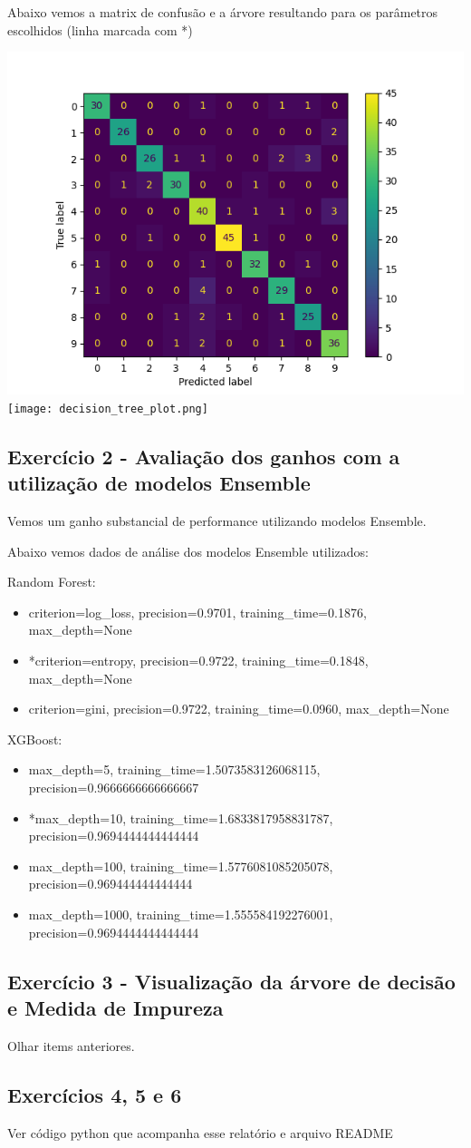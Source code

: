 \documentclass[11pt]{article}
\begin{document}
Abaixo vemos a matrix de confusão e a árvore resultando para os parâmetros escolhidos (linha marcada com *)
\\
\begin{center}
\includegraphics[height=0.28\textheight]{decision_tree_confusion_matrix.png}
\\
\texttt{[image: decision\_tree\_plot.png]}
\end{center}

\subsection{Exercício 2 - Avaliação dos ganhos com a utilização de modelos Ensemble}
Vemos um ganho substancial de performance utilizando modelos Ensemble.

Abaixo vemos dados de análise dos modelos Ensemble utilizados:

Random Forest:
\begin{itemize}
  \item criterion=log\_loss, precision=0.9701, training\_time=0.1876, max\_depth=None
  \item *criterion=entropy, precision=0.9722, training\_time=0.1848, max\_depth=None
  \item criterion=gini, precision=0.9722, training\_time=0.0960, max\_depth=None
\end{itemize}

XGBoost:
\begin{itemize}
  \item max\_depth=5, training\_time=1.5073583126068115, precision=0.9666666666666667 
  \item *max\_depth=10, training\_time=1.6833817958831787, precision=0.9694444444444444
  \item max\_depth=100, training\_time=1.5776081085205078, precision=0.969444444444444 
  \item max\_depth=1000, training\_time=1.555584192276001, precision=0.9694444444444444
\end{itemize}

\subsection{Exercício 3 - Visualização da árvore de decisão e Medida de Impureza}
Olhar items anteriores.

\subsection{Exercícios 4, 5 e 6}
Ver código python que acompanha esse relatório e arquivo README

\end{document}
